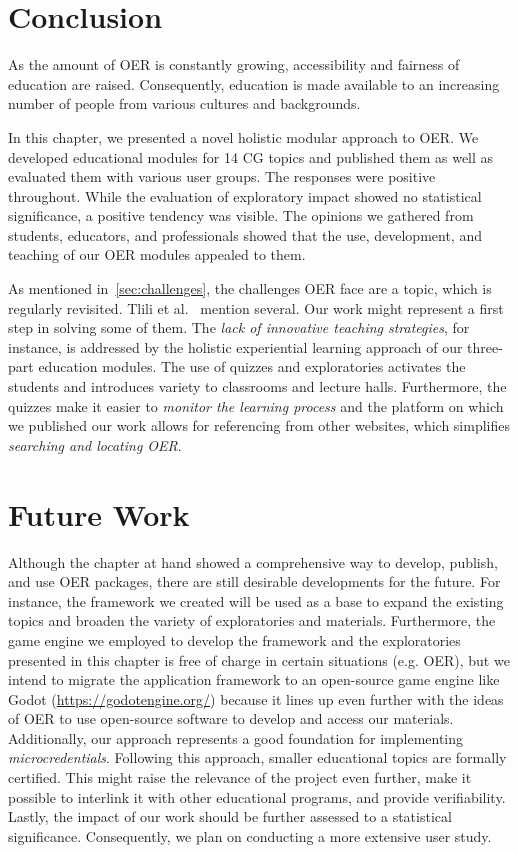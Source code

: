 
\section{Conclusion} %
As the amount of OER is constantly growing, accessibility and fairness of education are raised. Consequently, education is made available to an increasing number of people from various cultures and backgrounds.

In this chapter, we presented a novel holistic modular approach to OER. We developed educational modules for 14 CG topics and published them as well as evaluated them with various user groups. The responses were positive throughout. While the evaluation of exploratory impact showed no statistical significance, a positive tendency was visible. The opinions we gathered from students, educators, and professionals showed that the use, development, and teaching of our OER modules appealed to them.

As mentioned in~\autoref{sec:challenges}, the challenges OER face are a topic, which is regularly revisited. Tlili et al.~\cite{tlili:2021:towards} mention several. Our work might represent a first step in solving some of them. The \emph{lack of innovative teaching strategies}, for instance, is addressed by the holistic experiential learning approach of our three-part education modules. The use of quizzes and exploratories activates the students and introduces variety to classrooms and lecture halls. Furthermore, the quizzes make it easier to \emph{monitor the learning process} and the platform on which we published our work allows for referencing from other websites, which simplifies \emph{searching and locating OER}.



\section{Future Work}
Although the chapter at hand showed a comprehensive way to develop, publish, and use OER packages, there are still desirable developments for the future. For instance, the framework we created will be used as a base to expand the existing topics and broaden the variety of exploratories and materials. Furthermore, the game engine we employed to develop the framework and the exploratories presented in this chapter is free of charge in certain situations (e.g. OER), but we intend to migrate the application framework to an open-source game engine like Godot (\url{https://godotengine.org/}) because it lines up even further with the ideas of OER to use open-source software to develop and access our materials. Additionally, our approach represents a good foundation for implementing \emph{microcredentials}. Following this approach, smaller educational topics are formally certified. This might raise the relevance of the project even further, make it possible to interlink it with other educational programs, and provide verifiability. Lastly, the impact of our work should be further assessed to a statistical significance. Consequently, we plan on conducting a more extensive user study.